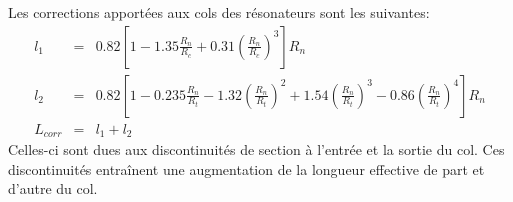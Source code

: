 \bigskip
Les corrections apportées aux cols des résonateurs sont les suivantes:
\begin{eqnarray*}
l_1 & = &  0.82 \left[ 1 - 1.35 \frac{R_n}{R_c} + 0.31 \left(\frac{R_n}{R_c} \right)^3  \right] R_n \\
l_2 & = &  0.82 \left[ 1 - 0.235 \frac{R_n}{R_t} - 1.32 \left( \frac{R_n}{R_t} \right)^2 +1.54 \left( \frac{R_n}{R_t}\right)^3 - 0.86 \left( \frac{R_n}{R_t}\right)^4  \right] R_n \\
L_{corr} & = &  l_1 + l_2
\end{eqnarray*}
Celles-ci sont dues aux discontinuités de section à l'entrée et la sortie du col. Ces discontinuités entraînent une augmentation de la longueur effective de part et d'autre du col.